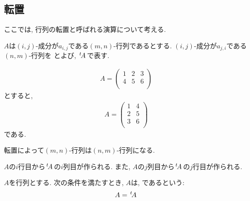 \subsection{転置}
ここでは, 行列の転置と呼ばれる演算について考える.
\begin{definition}
  \label{def:op:transpose}
  $A$は$(i,j)$-成分が$a_{i,j}$である$(m,n)$-行列であるとする.
  $(i,j)$-成分が$a_{j,i}$である$(n,m)$-行列を
  とよび,
  ${\left.^{t}\!A\right.}$で表す.
\end{definition}
\begin{example}
  \begin{align*}
    A=
    \begin{pmatrix}
      1&2&3\\
      4&5&6\\
    \end{pmatrix}
  \end{align*}
  とすると,
  \begin{align*}
    A=
    \begin{pmatrix}
      1&4\\
      2&5\\
      3&6\\
    \end{pmatrix}
  \end{align*}
  である.
\end{example}
\begin{remark}
  転置によって$(m,n)$-行列は$(n,m)$-行列になる.
\end{remark}
\begin{remark}
  $A$の$i$行目から${\left.^{t}\!A\right.}$の$i$列目が作られる.
  また,
  $A$の$j$列目から${\left.^{t}\!A\right.}$の$j$行目が作られる.
\end{remark}


\begin{definition}
  \label{def:symmat}
  $A$を行列とする.
  次の条件を満たすとき,
  $A$は,
  であるという:
  \begin{align*}
    A={\left.^{t}\!A\right.}
  \end{align*}
\end{definition}

